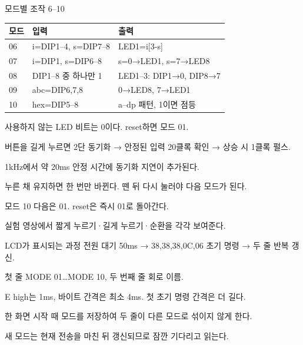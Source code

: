 \begin{frame}{모드별 조작 6–10}\relax
\small
\begin{center}\renewcommand{\arraystretch}{1.45}
\begin{tabular}{l|l|l}
모드 & 입력 & 출력\\\hline
06 & i=DIP1–4, s=DIP7–8 & LED1=i[3-s]\\
07 & i=DIP1, s=DIP6–8 & s=0→LED1, s=7→LED8\\
08 & DIP1–8 중 하나만 1 & LED1–3: DIP1→0, DIP8→7\\
09 & abc=DIP6,7,8 & 0→LED8, 7→LED1\\
10 & hex=DIP5–8 & a–dp 패턴, 1이면 점등\\
\end{tabular}\end{center}
사용하지 않는 LED 비트는 0이다. reset하면 모드 01.\par
\end{frame}

\begin{frame}{버튼을 길게 누르면}\relax
\small
2단 동기화 → 안정된 입력 20클록 확인 → 상승 시 1클록 펄스.\par\vspace{0.22cm}1kHz에서 약 20ms 안정 시간에 동기화 지연이 추가된다.\par\vspace{0.22cm}누른 채 유지하면 한 번만 바뀐다. 뗀 뒤 다시 눌러야 다음 모드가 된다.\par\vspace{0.22cm}모드 10 다음은 01. reset은 즉시 01로 돌아간다.\par\vspace{0.22cm}실험 영상에서 짧게 누르기·길게 누르기·순환을 각각 보여준다.\par
\end{frame}

\begin{frame}{LCD가 표시되는 과정}\relax
\small
전원 대기 50ms → 38,38,38,0C,06 초기 명령 → 두 줄 반복 갱신.\par\vspace{0.22cm}첫 줄 MODE 01…MODE 10, 두 번째 줄 회로 이름.\par\vspace{0.22cm}E high는 1ms, 바이트 간격은 최소 4ms. 첫 초기 명령 간격은 더 길다.\par\vspace{0.22cm}한 화면 시작 때 모드를 저장하여 두 줄이 다른 모드로 섞이지 않게 한다.\par\vspace{0.22cm}새 모드는 현재 전송을 마친 뒤 갱신되므로 잠깐 기다리고 읽는다.\par
\end{frame}


